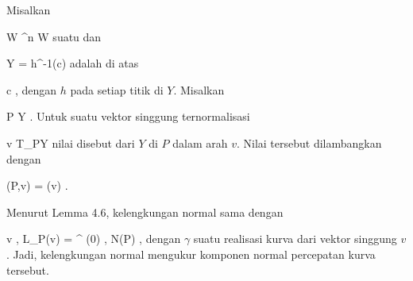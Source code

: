 {}
{

Misalkan

\mavergleichskette
{\vergleichskette
{ W
}
{ \subseteq }{ \R^n
}
{  }{
}
{    }{
}
{   }{
}
}
{}{}{}
 { W } { \R
} {}
suatu
dan

\mavergleichskette
{\vergleichskette
{ Y
}
{ = }{ h^{-1}(c)
}
{  }{
}
{    }{
}
{   }{
}
}
{}{}{}
adalah
di atas

\mavergleichskette
{\vergleichskette
{ c
}
{ \in }{ \R
}
{  }{
}
{    }{
}
{   }{
}
}
{}{}{,}
dengan $h$
pada setiap titik di $Y$. Misalkan

\mavergleichskette
{\vergleichskette
{ P
}
{ \in }{ Y
}
{  }{
}
{    }{
}
{   }{
}
}
{}{}{.}
Untuk suatu vektor singgung ternormalisasi

\mavergleichskette
{\vergleichskette
{ v
}
{ \in }{ T_PY
}
{  }{
}
{    }{
}
{   }{
}
}
{}{}{}
nilai
 disebut
dari $Y$ di $P$ dalam arah $v$. Nilai tersebut dilambangkan dengan

\mavergleichskette
{\vergleichskette
{ \kappa(P,v)
}
{ = }{ \kappa(v)
}
{  }{
}
{    }{
}
{   }{
}
}
{}{}{}
.

}

Menurut
Lemma 4.6,
kelengkungan normal sama dengan

\mavergleichskettedisp
{\vergleichskette
{ \left\langle  v  ,  L_P(v)  \right\rangle
}
{ =} { \left\langle  \gamma^{\prime \prime} (0)  ,  N(P)  \right\rangle
}
{ } {
}
{ } {
}
{ } {
}
}
{}{}{,}
dengan $\gamma$ suatu realisasi kurva dari vektor singgung $v$. Jadi, kelengkungan normal mengukur komponen normal percepatan kurva tersebut.



